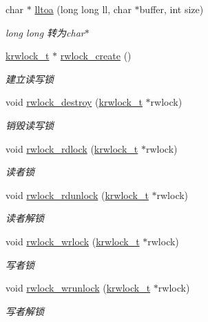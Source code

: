 \begin{DoxyCompactItemize}
char $\ast$ \hyperlink{a00100_a97f61794357611fc4017112c868420b9_a97f61794357611fc4017112c868420b9}{lltoa} (long long ll, char $\ast$buffer, int size)
\begin{DoxyCompactList}\small\item\em long long 转为char$\ast$ \end{DoxyCompactList}\item 
\hyperlink{a00066_a95d7b2a7caea750fda47edc638788908_a95d7b2a7caea750fda47edc638788908}{krwlock\+\_\+t} $\ast$ \hyperlink{a00100_af899c6ba097aac0431be0259d4a317ed_af899c6ba097aac0431be0259d4a317ed}{rwlock\+\_\+create} ()
\begin{DoxyCompactList}\small\item\em 建立读写锁 \end{DoxyCompactList}\item 
void \hyperlink{a00100_ad20298954497151f650d24c786e2af17_ad20298954497151f650d24c786e2af17}{rwlock\+\_\+destroy} (\hyperlink{a00066_a95d7b2a7caea750fda47edc638788908_a95d7b2a7caea750fda47edc638788908}{krwlock\+\_\+t} $\ast$rwlock)
\begin{DoxyCompactList}\small\item\em 销毁读写锁 \end{DoxyCompactList}\item 
void \hyperlink{a00100_a80866f5ce1f4238d179237b0af18156f_a80866f5ce1f4238d179237b0af18156f}{rwlock\+\_\+rdlock} (\hyperlink{a00066_a95d7b2a7caea750fda47edc638788908_a95d7b2a7caea750fda47edc638788908}{krwlock\+\_\+t} $\ast$rwlock)
\begin{DoxyCompactList}\small\item\em 读者锁 \end{DoxyCompactList}\item 
void \hyperlink{a00100_a2262145a5509ffa9b17db8f41ee28b8c_a2262145a5509ffa9b17db8f41ee28b8c}{rwlock\+\_\+rdunlock} (\hyperlink{a00066_a95d7b2a7caea750fda47edc638788908_a95d7b2a7caea750fda47edc638788908}{krwlock\+\_\+t} $\ast$rwlock)
\begin{DoxyCompactList}\small\item\em 读者解锁 \end{DoxyCompactList}\item 
void \hyperlink{a00100_a8894bccb783aaa36d111e838596ad15f_a8894bccb783aaa36d111e838596ad15f}{rwlock\+\_\+wrlock} (\hyperlink{a00066_a95d7b2a7caea750fda47edc638788908_a95d7b2a7caea750fda47edc638788908}{krwlock\+\_\+t} $\ast$rwlock)
\begin{DoxyCompactList}\small\item\em 写者锁 \end{DoxyCompactList}\item 
void \hyperlink{a00100_a3d305ecac0cf25e26fb3d0d0780d38dd_a3d305ecac0cf25e26fb3d0d0780d38dd}{rwlock\+\_\+wrunlock} (\hyperlink{a00066_a95d7b2a7caea750fda47edc638788908_a95d7b2a7caea750fda47edc638788908}{krwlock\+\_\+t} $\ast$rwlock)
\begin{DoxyCompactList}\small\item\em 写者解锁 \end{DoxyCompactList}\end{DoxyCompactItemize}



